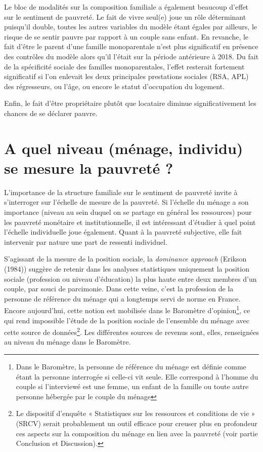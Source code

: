 \documentclass[12pt,a4paper]{reedthesis}
\begin{document}
Le bloc de modalités sur la composition familiale a également beaucoup d'effet sur le sentiment de pauvreté. Le fait de vivre seul(e) joue un rôle déterminant puisqu'il double, toutes les autres variables du modèle étant égales par ailleurs, le risque de se sentir pauvre par rapport à un couple sans enfant. En revanche, le fait d'être le parent d'une famille monoparentale n'est plus significatif en présence des contrôles du modèle alors qu'il l'était sur la période antérieure à 2018. Du fait de la spécificité sociale des familles monoparentales, l'effet resterait fortement significatif si l'on enlevait les deux principales prestations sociales (RSA, APL) des régresseurs, ou l'âge, ou encore le statut d'occupation du logement.

Enfin, le fait d'être propriétaire plutôt que locataire diminue significativement les chances de se déclarer pauvre.

\hypertarget{a-quel-niveau-muxe9nage-individu-se-mesure-la-pauvretuxe9}{%
\section{A quel niveau (ménage, individu) se mesure la pauvreté ?}\label{a-quel-niveau-muxe9nage-individu-se-mesure-la-pauvretuxe9}}

L'importance de la structure familiale sur le sentiment de pauvreté invite à s'interroger sur l'échelle de mesure de la pauvreté. Si l'échelle du ménage a son importance (niveau au sein duquel on se partage en général les ressources) pour les pauvreté monétaire et institutionnelle, il est intéressant d'étudier à quel point l'échelle individuelle joue également. Quant à la pauvreté subjective, elle fait intervenir par nature une part de ressenti individuel.

S'agissant de la mesure de la position sociale, la \emph{dominance approach} (Erikson (1984)) suggère de retenir dans les analyses statistiques uniquement la position sociale (profession ou niveau d'éducation) la plus haute entre deux membres d'un couple, par souci de parcimonie. Dans cette veine, c'est la profession de la personne de référence du ménage qui a longtemps servi de norme en France. Encore aujourd'hui, cette notion est mobilisée dans le Baromètre d'opinion\footnote{Dans le Baromètre, la personne de référence du ménage est définie comme étant la personne interrogée si celle-ci vit seule. Elle correspond à l'homme du couple si l'interviewé est une femme, un enfant de la famille ou toute autre personne hébergée par le couple du ménage}, ce qui rend impossible l'étude de la position sociale de l'ensemble du ménage avec cette source de données\footnote{Le dispositif d'enquête « Statistiques sur les ressources et conditions de vie » (SRCV) serait probablement un outil efficace pour creuser plus en profondeur ces aspects sur la composition du ménage en lien avec la pauvreté (voir partie Conclusion et Discussion).}. Les différentes sources de revenus sont, elles, renseignées au niveau du ménage dans le Baromètre.
\end{document}
